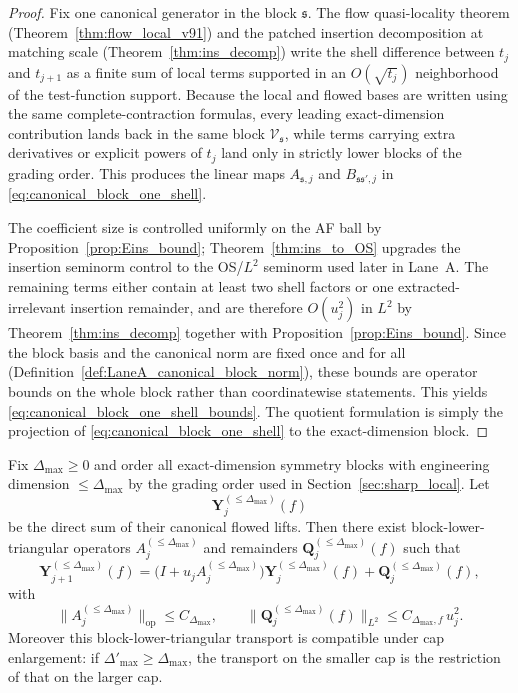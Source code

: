 \begin{proof}
Fix one canonical generator in the block $\mathfrak s$.
The flow quasi-locality theorem (Theorem~\ref{thm:flow_local_v91}) and the patched insertion decomposition at matching scale (Theorem~\ref{thm:ins_decomp}) write the shell difference between $t_j$ and $t_{j+1}$ as a finite sum of local terms supported in an $O(\sqrt{t_j})$ neighborhood of the test-function support.
Because the local and flowed bases are written using the same complete-contraction formulas, every leading exact-dimension contribution lands back in the same block $\mathscr V_{\mathfrak s}$,
while terms carrying extra derivatives or explicit powers of $t_j$ land only in strictly lower blocks of the grading order.
This produces the linear maps $A_{\mathfrak s,j}$ and $B_{\mathfrak s\mathfrak s',j}$ in \eqref{eq:canonical_block_one_shell}.

The coefficient size is controlled uniformly on the AF ball by Proposition~\ref{prop:Eins_bound};
Theorem~\ref{thm:ins_to_OS} upgrades the insertion seminorm control to the OS/$L^2$ seminorm used later in Lane~A.
The remaining terms either contain at least two shell factors or one extracted-irrelevant insertion remainder,
and are therefore $O(u_j^2)$ in $L^2$ by Theorem~\ref{thm:ins_decomp} together with Proposition~\ref{prop:Eins_bound}.
Since the block basis and the canonical norm are fixed once and for all (Definition~\ref{def:LaneA_canonical_block_norm}), these bounds are operator bounds on the whole block rather than coordinatewise statements.
This yields \eqref{eq:canonical_block_one_shell_bounds}.
The quotient formulation is simply the projection of \eqref{eq:canonical_block_one_shell} to the exact-dimension block.
\end{proof}

\begin{corollary}\label{cor:graded_triangular_transport_all_blocks}
Fix $\Delta_{\max}\ge 0$ and order all exact-dimension symmetry blocks with engineering dimension $\le \Delta_{\max}$ by the grading order used in Section~\ref{sec:sharp_local}.
Let
\[
\mathbf Y^{(\le \Delta_{\max})}_j(f)
\]
be the direct sum of their canonical flowed lifts.
Then there exist block-lower-triangular operators $A^{(\le \Delta_{\max})}_j$ and remainders $\mathbf Q^{(\le \Delta_{\max})}_j(f)$ such that
\begin{equation}\label{eq:finite_cap_one_shell}
\mathbf Y^{(\le \Delta_{\max})}_{j+1}(f)
=
\bigl(I+u_jA^{(\le \Delta_{\max})}_j\bigr)\mathbf Y^{(\le \Delta_{\max})}_j(f)
+\mathbf Q^{(\le \Delta_{\max})}_j(f),
\end{equation}
with
\[
\|A^{(\le \Delta_{\max})}_j\|_{\mathrm{op}}\le C_{\Delta_{\max}},
\qquad
\|\mathbf Q^{(\le \Delta_{\max})}_j(f)\|_{L^2}\le C_{\Delta_{\max},f}\,u_j^2.
\]
Moreover this block-lower-triangular transport is compatible under cap enlargement: if $\Delta'_{\max}\ge \Delta_{\max}$, the transport on the smaller cap is the restriction of that on the larger cap.
\end{corollary}

